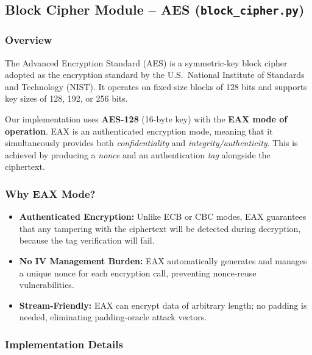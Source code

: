 \documentclass[12pt,a4paper]{article}
\begin{document}
\subsection{Block Cipher Module – AES (\texttt{block\_cipher.py})}

\subsubsection{Overview}
The Advanced Encryption Standard (AES) is a symmetric-key block cipher adopted as the encryption standard by the U.S.\ National Institute of Standards and Technology (NIST). It operates on fixed-size blocks of 128 bits and supports key sizes of 128, 192, or 256 bits.

Our implementation uses \textbf{AES-128} (16-byte key) with the \textbf{EAX mode of operation}. EAX is an authenticated encryption mode, meaning that it simultaneously provides both \emph{confidentiality} and \emph{integrity/authenticity}. This is achieved by producing a \emph{nonce} and an authentication \emph{tag} alongside the ciphertext.

\subsubsection{Why EAX Mode?}
\begin{itemize}
    \item \textbf{Authenticated Encryption:} Unlike ECB or CBC modes, EAX guarantees that any tampering with the ciphertext will be detected during decryption, because the tag verification will fail.
    \item \textbf{No IV Management Burden:} EAX automatically generates and manages a unique nonce for each encryption call, preventing nonce-reuse vulnerabilities.
    \item \textbf{Stream-Friendly:} EAX can encrypt data of arbitrary length; no padding is needed, eliminating padding-oracle attack vectors.
\end{itemize}

\subsubsection{Implementation Details}
\end{document}
